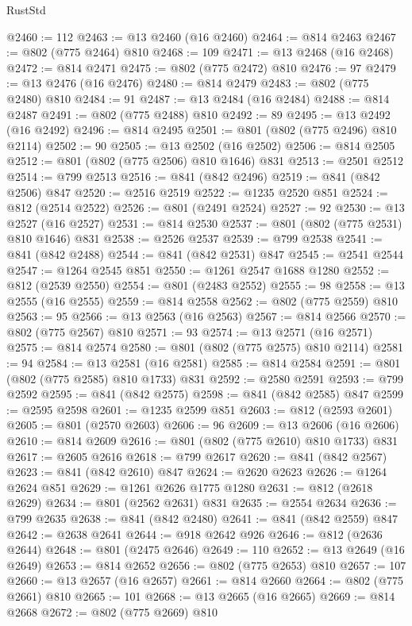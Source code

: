 \begin{lexlean}{RustStd}
\begin{coremodule}
@2460 := 112
@2463 := @13 @2460 (@16 @2460)
@2464 := @814 @2463
@2467 := @802 (@775 @2464) @810
@2468 := 109
@2471 := @13 @2468 (@16 @2468)
@2472 := @814 @2471
@2475 := @802 (@775 @2472) @810
@2476 := 97
@2479 := @13 @2476 (@16 @2476)
@2480 := @814 @2479
@2483 := @802 (@775 @2480) @810
@2484 := 91
@2487 := @13 @2484 (@16 @2484)
@2488 := @814 @2487
@2491 := @802 (@775 @2488) @810
@2492 := 89
@2495 := @13 @2492 (@16 @2492)
@2496 := @814 @2495
@2501 := @801 (@802 (@775 @2496) @810 @2114)
@2502 := 90
@2505 := @13 @2502 (@16 @2502)
@2506 := @814 @2505
@2512 := @801 (@802 (@775 @2506) @810 @1646) @831
@2513 := @2501 @2512
@2514 := @799 @2513
@2516 := @841 (@842 @2496)
@2519 := @841 (@842 @2506) @847
@2520 := @2516 @2519
@2522 := @1235 @2520 @851
@2524 := @812 (@2514 @2522)
@2526 := @801 (@2491 @2524)
@2527 := 92
@2530 := @13 @2527 (@16 @2527)
@2531 := @814 @2530
@2537 := @801 (@802 (@775 @2531) @810 @1646) @831
@2538 := @2526 @2537
@2539 := @799 @2538
@2541 := @841 (@842 @2488)
@2544 := @841 (@842 @2531) @847
@2545 := @2541 @2544
@2547 := @1264 @2545 @851
@2550 := @1261 @2547 @1688 @1280
@2552 := @812 (@2539 @2550)
@2554 := @801 (@2483 @2552)
@2555 := 98
@2558 := @13 @2555 (@16 @2555)
@2559 := @814 @2558
@2562 := @802 (@775 @2559) @810
@2563 := 95
@2566 := @13 @2563 (@16 @2563)
@2567 := @814 @2566
@2570 := @802 (@775 @2567) @810
@2571 := 93
@2574 := @13 @2571 (@16 @2571)
@2575 := @814 @2574
@2580 := @801 (@802 (@775 @2575) @810 @2114)
@2581 := 94
@2584 := @13 @2581 (@16 @2581)
@2585 := @814 @2584
@2591 := @801 (@802 (@775 @2585) @810 @1733) @831
@2592 := @2580 @2591
@2593 := @799 @2592
@2595 := @841 (@842 @2575)
@2598 := @841 (@842 @2585) @847
@2599 := @2595 @2598
@2601 := @1235 @2599 @851
@2603 := @812 (@2593 @2601)
@2605 := @801 (@2570 @2603)
@2606 := 96
@2609 := @13 @2606 (@16 @2606)
@2610 := @814 @2609
@2616 := @801 (@802 (@775 @2610) @810 @1733) @831
@2617 := @2605 @2616
@2618 := @799 @2617
@2620 := @841 (@842 @2567)
@2623 := @841 (@842 @2610) @847
@2624 := @2620 @2623
@2626 := @1264 @2624 @851
@2629 := @1261 @2626 @1775 @1280
@2631 := @812 (@2618 @2629)
@2634 := @801 (@2562 @2631) @831
@2635 := @2554 @2634
@2636 := @799 @2635
@2638 := @841 (@842 @2480)
@2641 := @841 (@842 @2559) @847
@2642 := @2638 @2641
@2644 := @918 @2642 @926
@2646 := @812 (@2636 @2644)
@2648 := @801 (@2475 @2646)
@2649 := 110
@2652 := @13 @2649 (@16 @2649)
@2653 := @814 @2652
@2656 := @802 (@775 @2653) @810
@2657 := 107
@2660 := @13 @2657 (@16 @2657)
@2661 := @814 @2660
@2664 := @802 (@775 @2661) @810
@2665 := 101
@2668 := @13 @2665 (@16 @2665)
@2669 := @814 @2668
@2672 := @802 (@775 @2669) @810

\end{coremodule}
\end{lexlean}
